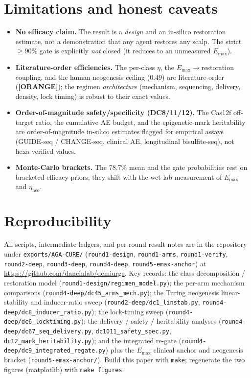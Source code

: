 \documentclass[11pt,a4paper]{article}
\newcommand{\tierbadge}[2]{\textcolor{#1}{\textbf{[#2]}}}
\providecommand{\tierOrange}{\tierbadge{orange!80!black}{ORANGE}}
\begin{document}
\section{Limitations and honest caveats}
\label{sec:limits}
\begin{itemize}\itemsep0.2em
\item \textbf{No efficacy claim.} The result is a \emph{design} and an in-silico
restoration estimate, not a demonstration that any agent restores any scalp. The strict
$\geq\!90\%$ gate is explicitly \emph{not} closed (it reduces to an unmeasured $E_{\max}$).
\item \textbf{Literature-order efficiencies.} The per-class $\eta$, the
$E_{\max}\!\to\!$restoration coupling, and the human neogenesis ceiling ($0.49$) are
literature-order (\tierOrange); the regimen \emph{architecture} (mechanism, sequencing,
delivery, density, lock timing) is robust to their exact values.
\item \textbf{Order-of-magnitude safety/specificity (DC8/11/12).} The Cas12f
off-target ratio, the cumulative AE budget, and the epigenetic-mark heritability are
order-of-magnitude in-silico estimates flagged for empirical assays (GUIDE-seq /
CHANGE-seq, clinical AE, longitudinal bisulfite-seq), not hexa-verified values.
\item \textbf{Monte-Carlo brackets.} The $78.7\%$ mean and the gate probabilities rest on
bracketed efficacy priors; they shift with the wet-lab measurement of $E_{\max}$ and
$\eta_{\text{neo}}$.
\end{itemize}

\section{Reproducibility}
\label{sec:repro}
All scripts, intermediate ledgers, and per-round result notes are in the repository under
\texttt{exports/AGA-CURE/} (\texttt{round1-design}, \texttt{round1-arms},
\texttt{round1-verify}, \texttt{round2-deep}, \texttt{round3-deep}, \texttt{round4-deep},
\texttt{round5-emax-anchor}) at \url{https://github.com/dancinlab/demiurge}. Key records:
the class-decomposition / restoration model (\texttt{round1-design/regimen\_model.py}); the
per-arm mechanism comparisons (\texttt{round4-deep/dc45\_arms\_mech.py}); the Turing
neogenesis linear-stability and inducer-ratio sweep (\texttt{round2-deep/dc1\_linstab.py},
\texttt{round4-deep/dc8\_inducer\_ratio.py}); the lock-timing sweep
(\texttt{round4-deep/dc6\_locktiming.py}); the delivery / safety / heritability analyses
(\texttt{round4-deep/dc67\_seq\_delivery.py}, \texttt{dc1011\_safety\_spec.py},
\texttt{dc12\_mark\_heritability.py}); and the integrated re-gate
(\texttt{round4-deep/dc9\_integrated\_regate.py}) plus the $E_{\max}$ clinical anchor and
neogenesis bracket (\texttt{round5-emax-anchor/}). Build this paper with \texttt{make};
regenerate the two figures (matplotlib) with \texttt{make figures}.
\end{document}
